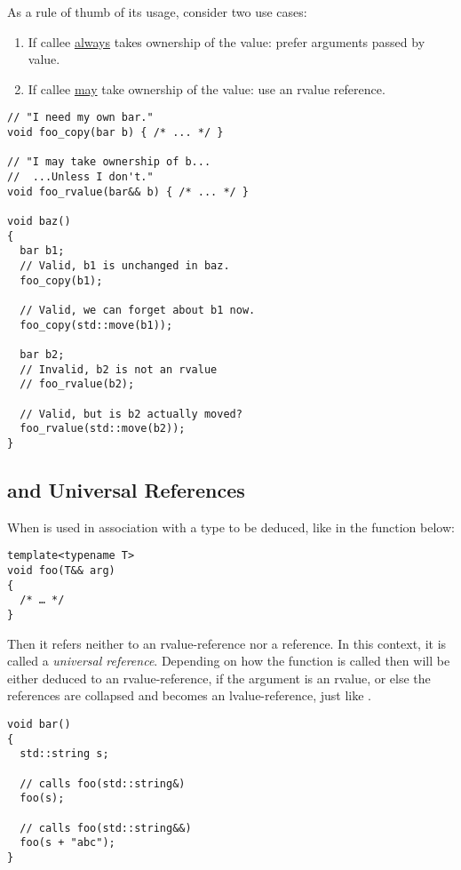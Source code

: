 \begin{guideline}
  As a rule of thumb of its usage, consider two use cases:

  \begin{enumerate}
  \item If callee \underline{always} takes ownership of the value:
    prefer arguments passed by value.
  \item If callee \underline{may} take ownership of the value: use an
    rvalue reference.
  \end{enumerate}
\end{guideline}

\begin{lstlisting}
// "I need my own bar."
void foo_copy(bar b) { /* ... */ }

// "I may take ownership of b...
//  ...Unless I don't."
void foo_rvalue(bar&& b) { /* ... */ }

void baz()
{
  bar b1;
  // Valid, b1 is unchanged in baz.
  foo_copy(b1);

  // Valid, we can forget about b1 now.
  foo_copy(std::move(b1));

  bar b2;
  // Invalid, b2 is not an rvalue
  // foo_rvalue(b2);

  // Valid, but is b2 actually moved?
  foo_rvalue(std::move(b2));
}
\end{lstlisting}

\subsection{ and Universal References}

When \code{\&\&} is used in association with a type to be deduced,
like in the function below:

\begin{lstlisting}
template<typename T>
void foo(T&& arg)
{
  /* … */
}
\end{lstlisting}

Then it refers neither to an rvalue-reference nor a reference. In this
context, it is called a \emph{universal reference}. Depending on how
the function is called then  will be either deduced to an
rvalue-reference, if the argument is an rvalue, or else the references
are collapsed and  becomes an lvalue-reference, just like
.

\begin{lstlisting}
void bar()
{
  std::string s;

  // calls foo(std::string&)
  foo(s);

  // calls foo(std::string&&)
  foo(s + "abc");
}
\end{lstlisting}

